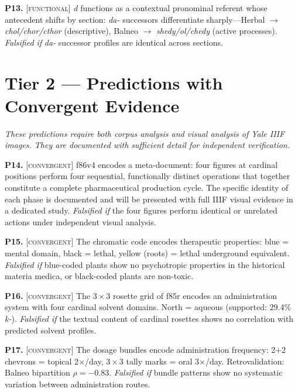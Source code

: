 \documentclass[11pt,a4paper]{article}
\newcommand{\functional}{\textsc{[functional]}}
\newcommand{\convergent}{\textsc{[convergent]}}
\newcommand{\falsmark}{\textit{Falsified if}}
\begin{document}
\medskip

\noindent\textbf{P13.} \functional{} \textit{d} functions as a contextual pronominal referent whose antecedent shifts by section: \textit{da-} successors differentiate sharply---Herbal $\rightarrow$ \textit{chol/chor/cthor} (descriptive), Balneo $\rightarrow$ \textit{shedy/ol/chedy} (active processes). \falsmark{} \textit{da-} successor profiles are identical across sections.

\section{Tier 2 --- Predictions with Convergent Evidence}

\textit{These predictions require both corpus analysis and visual analysis of Yale IIIF images. They are documented with sufficient detail for independent verification.}

\medskip

\noindent\textbf{P14.} \convergent{} f86v4 encodes a meta-document: four figures at cardinal positions perform four sequential, functionally distinct operations that together constitute a complete pharmaceutical production cycle. The specific identity of each phase is documented and will be presented with full IIIF visual evidence in a dedicated study. \falsmark{} the four figures perform identical or unrelated actions under independent visual analysis.

\medskip

\noindent\textbf{P15.} \convergent{} The chromatic code encodes therapeutic properties: blue = mental domain, black = lethal, yellow (roots) = lethal underground equivalent. \falsmark{} blue-coded plants show no psychotropic properties in the historical materia medica, or black-coded plants are non-toxic.

\medskip

\noindent\textbf{P16.} \convergent{} The $3 \times 3$ rosette grid of f85r encodes an administration system with four cardinal solvent domains. North = aqueous (supported: 29.4\% \textit{k-}). \falsmark{} the textual content of cardinal rosettes shows no correlation with predicted solvent profiles.

\medskip

\noindent\textbf{P17.} \convergent{} The dosage bundles encode administration frequency: 2+2 chevrons = topical 2$\times$/day, $3 \times 3$ tally marks = oral 3$\times$/day. Retrovalidation: Balneo bipartition $\rho = -0.83$. \falsmark{} bundle patterns show no systematic variation between administration routes.
\end{document}
